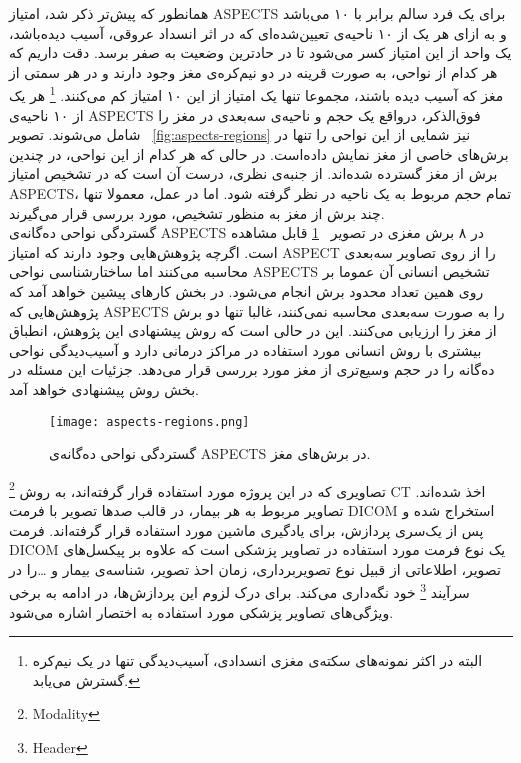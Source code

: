همانطور که پیش‌تر ذکر شد، امتیاز ASPECTS برای یک فرد سالم برابر با ۱۰ می‌باشد و به ازای هر یک از ۱۰ ناحیه‌ی تعیین‌شده‌ای که در اثر انسداد عروقی، آسیب دیده‌باشد، یک واحد از این امتیاز کسر می‌شود تا در حادترین وضعیت به صفر برسد.
دقت داریم که هر کدام از نواحی، به صورت قرینه در دو نیم‌کره‌ی مغز وجود دارند و در هر سمتی از مغز که آسیب دیده باشند، مجموعا تنها یک امتیاز از این ۱۰ امتیاز کم می‌کنند.
\footnote{البته در اکثر نمونه‌های سکته‌ی مغزی انسدادی، آسیب‌دیدگی تنها در یک نیم‌کره گسترش می‌یابد.}
هر یک از ۱۰ ناحیه‌ی ASPECTS فوق‌الذکر، درواقع یک حجم و ناحیه‌ی سه‌بعدی در مغز را شامل می‌شوند.
تصویر ~\ref{fig:aspects-regions} نیز شمایی از این نواحی را تنها در برش‌های خاصی از مغز نمایش داده‌است.
در حالی که هر کدام از این نواحی، در چندین برش از مغز گسترده شده‌اند.
از جنبه‌ی نظری، درست آن است که در تشخیص امتیاز ASPECTS، تمام حجم مربوط به یک ناحیه در نظر گرفته شود.
اما در عمل، معمولا تنها چند برش از مغز به منظور تشخیص، مورد بررسی قرار می‌گیرند.\\

گستردگی نواحی ده‌گانه‌ی ASPECTS در ۸ برش مغزی در تصویر ~\ref{fig:aspects-slices} قابل مشاهده است.
اگرچه پژوهش‌هایی وجود دارند که امتیاز ASPECT را از روی تصاویر سه‌بعدی محاسبه می‌کنند اما 
ساختارشناسی نواحی ASPECTS تشخیص انسانی آن عموما بر روی همین تعداد محدود برش انجام می‌شود.
در بخش کارهای پیشین خواهد آمد که پژوهش‌هایی که ASPECTS را به صورت سه‌بعدی محاسبه نمی‌کنند، غالبا تنها دو برش از مغز را ارزیابی می‌کنند.
این در حالی است که روش پیشنهادی این پژوهش، انطباق بیشتری با روش انسانی مورد استفاده در مراکز درمانی دارد و 
آسیب‌دیدگی نواحی ده‌گانه را در حجم وسیع‌تری از مغز مورد بررسی قرار می‌دهد. جزئیات این مسئله در بخش روش پیشنهادی خواهد آمد.

\begin{figure}[ht]
\centering
\texttt{[image: aspects-regions.png]}
\caption[]{گستردگی نواحی ده‌گانه‌ی ASPECTS در برش‌های مغز.}
\label{fig:aspects-slices}
\end{figure}


تصاویری که در این پروژه مورد استفاده قرار گرفته‌اند، به روش
\footnote{Modality}
 CT اخذ شده‌اند.
تصاویر مربوط به هر بیمار، در قالب صدها تصویر با فرمت DICOM استخراج شده و پس از یک‌سری پردازش، برای یادگیری ماشین مورد استفاده قرار گرفته‌اند.
فرمت DICOM یک نوع فرمت مورد استفاده در تصاویر پزشکی است که علاوه بر پیکسل‌های تصویر، اطلاعاتی از قبیل نوع تصویربرداری، زمان احذ تصویر، شناسه‌ی بیمار و \dots را در سرآیند
\footnote{Header}
خود نگه‌داری می‌کند.
برای درک لزوم این پردازش‌ها، در ادامه به برخی ویژگی‌های تصاویر پزشکی مورد استفاده به اختصار اشاره می‌شود.

